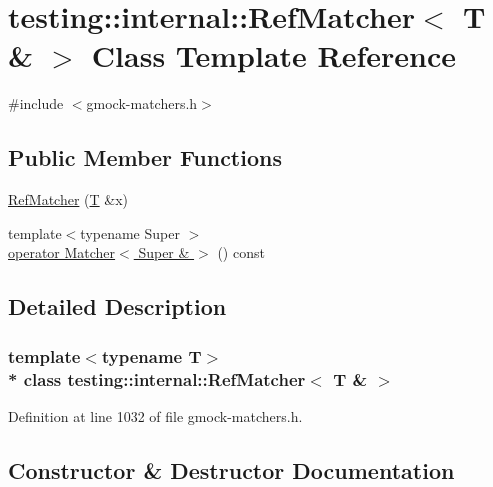 \hypertarget{classtesting_1_1internal_1_1_ref_matcher_3_01_t_01_6_01_4}{}\section{testing\+:\+:internal\+:\+:Ref\+Matcher$<$ T \& $>$ Class Template Reference}
\label{classtesting_1_1internal_1_1_ref_matcher_3_01_t_01_6_01_4}


{\ttfamily \#include $<$gmock-\/matchers.\+h$>$}

\subsection*{Public Member Functions}
\begin{DoxyCompactItemize}
\item 
\hyperlink{classtesting_1_1internal_1_1_ref_matcher_3_01_t_01_6_01_4_a94eaec01f11b3ed704092a62cdb9c21c}{Ref\+Matcher} (\hyperlink{functions__7_8js_adf1f3edb9115acb0a1e04209b7a9937b}{T} \&x)
\item 
{\footnotesize template$<$typename Super $>$ }\\\hyperlink{classtesting_1_1internal_1_1_ref_matcher_3_01_t_01_6_01_4_ab9f16e34d127ef44dfb27c3e0f2aa163}{operator Matcher$<$ Super \& $>$} () const 
\end{DoxyCompactItemize}


\subsection{Detailed Description}
\subsubsection*{template$<$typename T$>$\\*
class testing\+::internal\+::\+Ref\+Matcher$<$ T \& $>$}



Definition at line 1032 of file gmock-\/matchers.\+h.



\subsection{Constructor \& Destructor Documentation}
